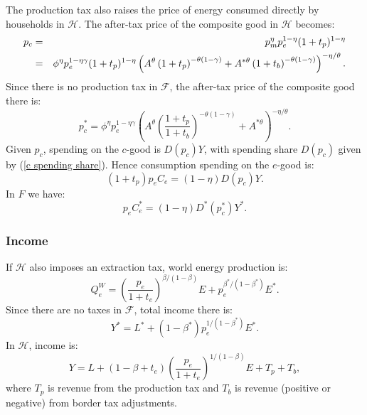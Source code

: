 \documentclass[notitlepage,12pt]{article}
\begin{document}
The production tax also raises the price of energy consumed directly by
households in $\mathcal{H}$. The after-tax price of the composite good in $%
\mathcal{H}$ becomes:%
\begin{eqnarray}
p_{c} &=&p_{m}^{\eta }p_{e}^{1-\eta }(1+t_{p})^{1-\eta }  \notag \\
&=&\phi ^{\eta }p_{e}^{1-\eta \gamma }(1+t_{p})^{1-\eta }\left( A^{\theta
}\left( 1+t_{p}\right) ^{-\theta \left( 1-\gamma \right) }+A^{\ast \theta
}\left( 1+t_{b}\right) ^{-\theta \left( 1-\gamma \right) }\right) ^{-\eta
/\theta }.  \label{p_c partial bta}
\end{eqnarray}%
Since there is no production tax in $\mathcal{F}$, the after-tax price of
the composite good there is:%
\begin{equation}
p_{c}^{\ast }=\phi ^{\eta }p_{e}^{1-\eta \gamma }\left( A^{\theta }\left( 
\frac{1+t_{p}}{1+t_{b}}\right) ^{-\theta \left( 1-\gamma \right) }+A^{\ast
\theta }\right) ^{-\eta /\theta }.  \label{p_c star partial bta}
\end{equation}%
Given $p_{c}$, spending on the $c$-good is $D(p_{c})Y$, with spending share $%
D(p_{c})$ given by (\ref{c spending share}). Hence consumption spending on
the $e$-good is:%
\begin{equation*}
(1+t_{p})p_{e}C_{e}=\left( 1-\eta \right) D(p_{c})Y.
\end{equation*}%
In $F$ we have:%
\begin{equation*}
p_{e}C_{e}^{\ast }=\left( 1-\eta \right) D^{\ast }(p_{c}^{\ast })Y^{\ast }.
\end{equation*}

\subsubsection{Income}

If $\mathcal{H}$ also imposes an extraction tax, world energy production is:%
\begin{equation*}
Q_{e}^{W}=\left( \frac{p_{e}}{1+t_{e}}\right) ^{\beta /(1-\beta
)}E+p_{e}^{\beta ^{\ast }/(1-\beta ^{\ast })}E^{\ast }.
\end{equation*}%
Since there are no taxes in $\mathcal{F}$, total income there is:%
\begin{equation}
Y^{\ast }=L^{\ast }+\left( 1-\beta ^{\ast }\right) p_{e}^{1/(1-\beta ^{\ast
})}E^{\ast }.  \label{Y star partial bta}
\end{equation}%
In $\mathcal{H}$, income is:%
\begin{equation*}
Y=L+\left( 1-\beta +t_{e}\right) \left( \frac{p_{e}}{1+t_{e}}\right)
^{1/(1-\beta )}E+T_{p}+T_{b},
\end{equation*}%
where $T_{p}$ is revenue from the production tax and $T_{b}$ is revenue
(positive or negative) from border tax adjustments.
\end{document}
